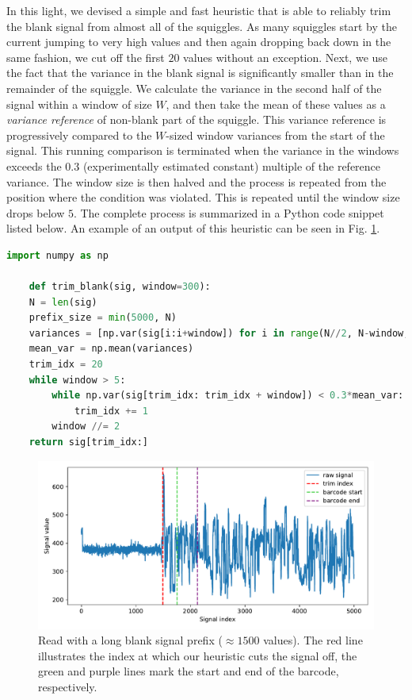In this light, we devised a simple and fast heuristic that is able to reliably trim the blank signal from almost all of the squiggles. As many squiggles start by the current jumping to very high values and then again dropping back down in the same fashion, we cut off the first $20$ values without an exception. Next, we use the fact that the variance in the blank signal is significantly smaller than in the remainder of the squiggle. We calculate the variance in the second half of the signal within a window of size $W$, and then take the mean of these values as a \textit{variance reference} of non-blank part of the squiggle. This variance reference is progressively compared to the $W$-sized window variances from the start of the signal. This running comparison is terminated when the variance in the windows exceeds the $0.3$ (experimentally estimated constant) multiple of the reference variance. The window size is then halved and the process is repeated from the position where the condition was violated. This is repeated until the window size drops below $5$. The complete process is summarized in a Python code snippet listed below. An example of an output of this heuristic can be seen in Fig. \ref{fig:trimmer_cut}.

\begin{lstlisting}[language=Python, caption={The heuristic for cutting off the blank signal prefixes.}, label={trimmer}]
import numpy as np

    def trim_blank(sig, window=300):
    N = len(sig)
    prefix_size = min(5000, N)
    variances = [np.var(sig[i:i+window]) for i in range(N//2, N-window, window)]
    mean_var = np.mean(variances)
    trim_idx = 20
    while window > 5:
        while np.var(sig[trim_idx: trim_idx + window]) < 0.3*mean_var:
            trim_idx += 1
        window //= 2
    return sig[trim_idx:]
\end{lstlisting}

\begin{figure}[!ht]
    \centering
    \includegraphics[scale=0.7]{images/trim_1470.pdf}
    \caption[Long blank prefix in a read]{Read with a long blank signal prefix ($\approx 1500$ values). The red line illustrates the index at which our heuristic cuts the signal off, the green and purple lines mark the start and end of the barcode, respectively.}
    \label{fig:trimmer_cut}
\end{figure}

